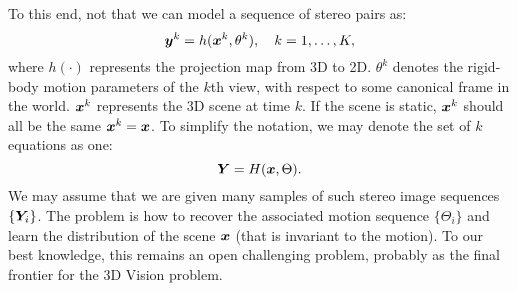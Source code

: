 \documentclass[../../book-main.tex]{subfiles}
\begin{document}

To this end, not that we can model a sequence of stereo pairs as:
\begin{equation}
    \bm{y}^k = h(\bm{x}^k, \theta^k), \quad k=1, \ldots, K,
\end{equation}
where $h(\cdot)$ represents the projection map from 3D to 2D. $\theta^k$ denotes the rigid-body motion parameters of the $k$th view, with respect to some canonical frame in the world. $\bm{x}^k$ represents the 3D scene at time $k$. If the scene is static, $\bm{x}^k$ should all be the same $\bm{x}^k = \bm{x}$. To simplify the notation, we may denote the set of $k$ equations as one:
\begin{equation}
    \bm{Y} = H(\bm{x},\Theta). 
\end{equation}
We may assume that we are given many samples of such stereo image sequences $\{\bm{Y}_i\}$. The problem is how to recover the associated motion sequence $\{\Theta_i\}$ and learn the distribution of the scene $\bm{x}$ (that is invariant to the motion). To our best knowledge, this remains an open challenging problem, probably as the final frontier for the 3D Vision problem. 


\end{document}

